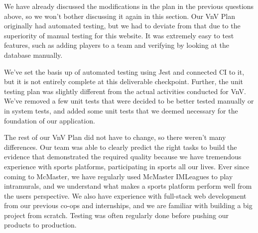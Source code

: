\documentclass[12pt, titlepage]{article}
\begin{document}
\begin{enumerate}
  We have already discussed the modifications in the plan in the previous questions above, so we won't bother discussing it again in this section. Our VnV Plan originally had automated testing, but we had to deviate from that due to the superiority of manual testing for this website. It was extremely easy to test features, such as adding players to a team and verifying by looking at the database manually. 
  
  We've set the basis up of automated testing using Jest and connected CI to it, but it is not entirely complete at this deliverable checkpoint. Further, the unit testing plan was slightly different from the actual activities conducted for VnV. We've removed a few unit tests that were decided to be better tested manually or in system tests, and added some unit tests that we deemed necessary for the foundation of our application.

  The rest of our VnV Plan did not have to change, so there weren't many differences. Our team was able to clearly predict the right tasks to build the evidence that demonstrated the required quality because we have tremendous experience with sports platforms, participating in sports all our lives. Ever since coming to McMaster, we have regularly used McMaster IMLeagues to play intramurals, and we understand what makes a sports platform perform well from the users perspective. We also have experience with full-stack web development from our previous co-ops and internships, and we are familiar with building a big project from scratch. Testing was often regularly done before pushing our products to production.
  
\end{enumerate}
\end{document}
